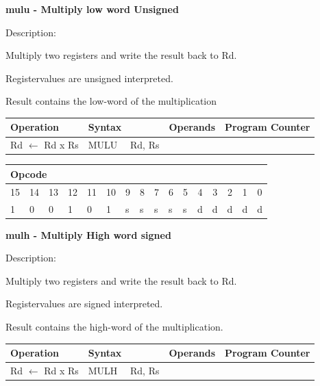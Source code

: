 \documentclass[%
	pdftex,
	a4paper,
	oneside,
	bibtotoc,%
	idxtotoc,%
	bibtotocnumbered,
	halfparskip,%
]{scrbook}
\begin{document}
\bigskip

\textbf{mulu - Multiply low word Unsigned}

Description:

Multiply two registers and write the result back to Rd.

Registervalues are unsigned interpreted.

Result contains the low-word of the multiplication

\begin{tabular}{|l|l|l|l|}
\hline
Operation & Syntax & Operands & Program Counter \\ \hline
Rd $\leftarrow $ Rd x Rs & MULU \ \ Rd, Rs &  &  \\ \hline
\end{tabular}

\begin{tabular}{|c|c|c|c|c|c|c|c|c|c|c|c|c|c|c|c|}
\hline
\multicolumn{6}{|l|}{Opcode} & \multicolumn{5}{|l|}{} & \multicolumn{5}{|l|}{
} \\ \hline
15 & 14 & 13 & 12 & 11 & 10 & 9 & 8 & 7 & 6 & 5 & 4 & 3 & 2 & 1 & 0 \\ \hline
\multicolumn{1}{|l|}{1} & \multicolumn{1}{|l|}{0} & \multicolumn{1}{|l|}{0}
& \multicolumn{1}{|l|}{1} & \multicolumn{1}{|l|}{0} & \multicolumn{1}{|l|}{1}
& \multicolumn{1}{|l|}{s} & \multicolumn{1}{|l|}{s} & \multicolumn{1}{|l|}{s}
& \multicolumn{1}{|l|}{s} & \multicolumn{1}{|l|}{s} & \multicolumn{1}{|l|}{d}
& \multicolumn{1}{|l|}{d} & \multicolumn{1}{|l|}{d} & \multicolumn{1}{|l|}{d}
& \multicolumn{1}{|l|}{d} \\ \hline
\end{tabular}

\bigskip

\textbf{mulh - Multiply High word signed}

Description:

Multiply two registers and write the result back to Rd.

Registervalues are signed interpreted.

Result contains the high-word of the multiplication.

\begin{tabular}{|l|l|l|l|}
\hline
Operation & Syntax & Operands & Program Counter \\ \hline
Rd $\leftarrow $ Rd x Rs & MULH \ \ Rd, Rs &  &  \\ \hline
\end{tabular}
\end{document}
